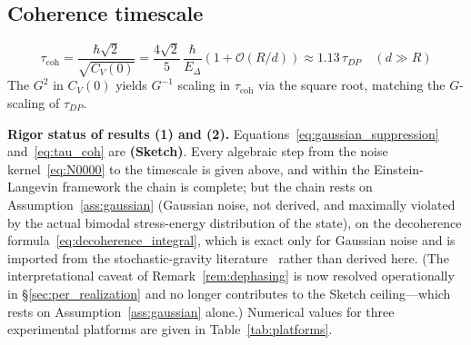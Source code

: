 \documentclass[12pt,a4paper]{article}
\theoremstyle{remark}
\begin{document}
\subsection{Coherence timescale}

\begin{equation}
\tau_{\text{coh}} = \frac{\hbar\sqrt{2}}{\sqrt{C_V(0)}}
= \frac{4\sqrt{2}}{5}\,\frac{\hbar}{E_\Delta}\left(1 + \mathcal{O}(R/d)\right)
\approx 1.13\,\tau_{DP} \quad (d \gg R)
\label{eq:tau_coh}
\end{equation}
The $G^2$ in $C_V(0)$ yields $G^{-1}$ scaling in $\tau_{\text{coh}}$ via the square root,
matching the $G$-scaling of $\tau_{DP}$.

\textbf{Rigor status of results (1) and (2).} Equations~\eqref{eq:gaussian_suppression}
and~\eqref{eq:tau_coh} are \textbf{(Sketch)}. Every algebraic step from the noise
kernel~\eqref{eq:N0000} to the timescale is given above, and within the Einstein-Langevin
framework the chain is complete; but the chain rests on
Assumption~\ref{ass:gaussian} (Gaussian noise, not derived, and maximally violated by the
actual bimodal stress-energy distribution of the state), on the decoherence
formula~\eqref{eq:decoherence_integral}, which is exact only for Gaussian noise and is
imported from the stochastic-gravity literature~\cite{hu_verdaguer} rather than derived
here. (The interpretational caveat of Remark~\ref{rem:dephasing} is now resolved
operationally in \S\ref{sec:per_realization} and no longer contributes to the Sketch
ceiling---which rests on Assumption~\ref{ass:gaussian} alone.) Numerical values
for three experimental platforms are given in Table~\ref{tab:platforms}.
\end{document}
